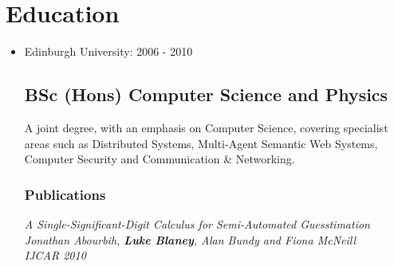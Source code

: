 \documentclass[a4paper]{article}
\newenvironment{detail}{\begin{adjustwidth}{10pt}{}}{\end{adjustwidth}}
\begin{document}
\section*{Education}
\begin{itemize}

\item Edinburgh University: 2006 - 2010
\subsection*{BSc (Hons) Computer Science and Physics}
\begin{detail}
A joint degree, with an emphasis on Computer Science, covering specialist areas such as Distributed Systems, Multi-Agent Semantic Web Systems, Computer Security and Communication \& Networking.
\subsubsection*{Publications}
\em A Single-Significant-Digit Calculus for Semi-Automated Guesstimation \em\\
Jonathan Abourbih, {\bf Luke Blaney}, Alan Bundy and Fiona McNeill\\
IJCAR 2010
\end{detail}


\end{itemize}
\end{document}
